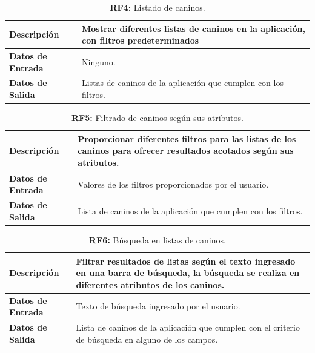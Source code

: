 \documentclass[a4paper, 12pt]{article}
\begin{document}
\begin{table}[H]
\captionsetup{list=no}%
\captionsetup{justification=raggedright,singlelinecheck=false}
\captionsetup{labelformat=empty}
\caption{\textbf{RF4:} Listado de caninos.}
\label{tab:RF4}
	\begin{tabular}{|m{5cm}|m{10cm}|}
	\hline
	\textbf{Descripción} & Mostrar diferentes listas de caninos en la aplicación, con filtros predeterminados \\ 
	\hline
	\textbf{Datos de Entrada} & Ninguno. \\ 
	\hline
	\textbf{Datos de Salida} & Listas de caninos de la aplicación que cumplen con los filtros. \\ 
	\hline
\end{tabular}
\end{table}

\begin{table}[H]
\captionsetup{list=no}%
\captionsetup{justification=raggedright,singlelinecheck=false}
\captionsetup{labelformat=empty}
\caption{\textbf{RF5:} Filtrado de caninos según sus atributos.}
\label{tab:RF5}
	\begin{tabular}{|m{5cm}|m{10cm}|}
	\hline
	\textbf{Descripción} & Proporcionar diferentes filtros para las listas de los caninos para ofrecer resultados acotados según sus atributos. \\ 
	\hline
	\textbf{Datos de Entrada} & Valores de los filtros proporcionados por el usuario. \\ 
	\hline
	\textbf{Datos de Salida} & Lista de caninos de la aplicación que cumplen con los filtros. \\ 
	\hline
\end{tabular}
\end{table}

\begin{table}[H]
\captionsetup{list=no}%
\captionsetup{justification=raggedright,singlelinecheck=false}
\captionsetup{labelformat=empty}
\caption{\textbf{RF6:} Búsqueda en listas de caninos.}
\label{tab:RF6}
	\begin{tabular}{|m{5cm}|m{10cm}|}
	\hline
	\textbf{Descripción} & Filtrar resultados de listas según el texto ingresado en una barra de búsqueda, la búsqueda se realiza en diferentes atributos de los caninos. \\ 
	\hline
	\textbf{Datos de Entrada} & Texto de búsqueda ingresado por el usuario. \\ 
	\hline
	\textbf{Datos de Salida} &  Lista de caninos de la aplicación que cumplen con el criterio de búsqueda en alguno de los campos. \\ 
	\hline
\end{tabular}
\end{table}
\end{document}
